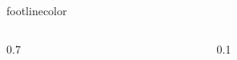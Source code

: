 {%
    \begin{beamercolorbox}[wd=\paperwidth,ht=0.08\paperheight]{footlinecolor}
        \begin{columns}
            \begin{column}{0.7\paperwidth}
                {%
                    \fontsize{8pt}{8.75pt}\color{unalBg2}%
                     \\%
                    \vspace*{5pt}
                }
            \end{column}
            \begin{column}{0.1\paperwidth}
            \end{column}
        \end{columns}
    \end{beamercolorbox}
}

{%
    \fontsize{18pt}{20pt}%
    \color{unalAcc1}%
    \AncizarSerifEB{\insertframetitle{}} \\
    \fontsize{10pt}{12pt}%
    \AncizarSansLight{\MakeUppercase{\insertframesubtitle{}}}
}